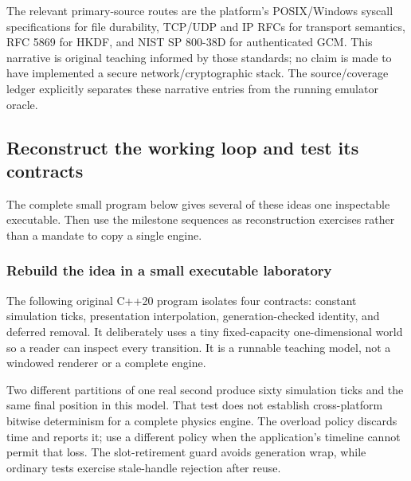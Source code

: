 The relevant primary-source routes are the platform's POSIX/Windows syscall specifications for file durability, TCP/UDP and IP RFCs for transport semantics, RFC 5869 for HKDF, and NIST SP 800-38D for authenticated GCM. This narrative is original teaching informed by those standards; no claim is made to have implemented a secure network/cryptographic stack. The source/coverage ledger explicitly separates these narrative entries from the running emulator oracle.

\subsection{Reconstruct the working loop and test its contracts}\label{reconstruct-the-working-loop-and-test-its-contracts}

The complete small program below gives several of these ideas one inspectable executable. Then use the milestone sequences as reconstruction exercises rather than a mandate to copy a single engine.

\subsubsection{Rebuild the idea in a small executable laboratory}\label{rebuild-the-idea-in-a-small-executable-laboratory}

The following original C++20 program isolates four contracts: constant simulation ticks, presentation interpolation, generation-checked identity, and deferred removal. It deliberately uses a tiny fixed-capacity one-dimensional world so a reader can inspect every transition. It is a runnable teaching model, not a windowed renderer or a complete engine.

Two different partitions of one real second produce sixty simulation ticks and the same final position in this model. That test does not establish cross-platform bitwise determinism for a complete physics engine. The overload policy discards time and reports it; use a different policy when the application's timeline cannot permit that loss. The slot-retirement guard avoids generation wrap, while ordinary tests exercise stale-handle rejection after reuse.

